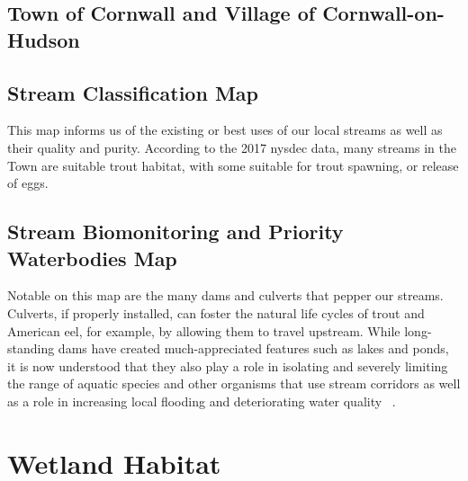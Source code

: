 \subsection*{Town of Cornwall and Village of Cornwall-on-Hudson}
\subsection*{Stream Classification Map}
This map informs us of the existing or best uses of our local streams as well
as their quality and purity. According to the 2017 \gls{nysdec} data, many
streams in the Town are suitable trout habitat, with some suitable for trout
spawning, or release of eggs.

\subsection*{Stream Biomonitoring and Priority Waterbodies Map}
Notable on this map are the many dams and culverts that pepper our streams.
Culverts, if properly installed, can foster the natural life cycles of trout
and American eel, for example, by allowing them to travel upstream. While
long-standing dams have created much-appreciated features such as lakes and
ponds, it is now understood that they also play a role in isolating and
severely limiting the range of aquatic species and other organisms that use
stream corridors as well as a role in increasing local flooding and
deteriorating water quality ~\citep{haeckel2014}.

\section{Wetland Habitat}
